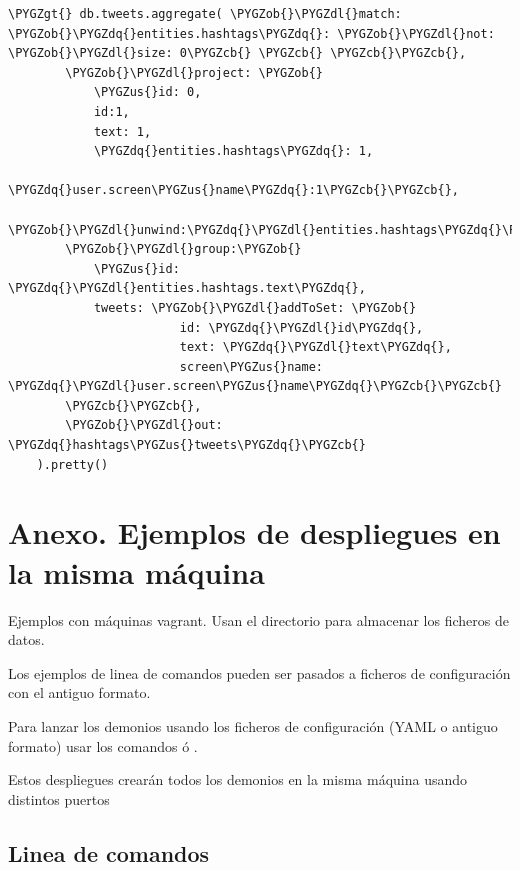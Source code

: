 \documentclass[a4paper,10pt,english]{sphinxmanual}
\def\PYGZus{\char`\_}
\def\PYGZob{\char`\{}
\def\PYGZcb{\char`\}}
\def\PYGZgt{\char`\>}
\def\PYGZdl{\char`\$}
\def\PYGZdq{\char`\"}
\begin{document}
\begin{itemize}
\begin{Verbatim}[commandchars=\\\{\}]
\PYGZgt{} db.tweets.aggregate( \PYGZob{}\PYGZdl{}match: \PYGZob{}\PYGZdq{}entities.hashtags\PYGZdq{}: \PYGZob{}\PYGZdl{}not: \PYGZob{}\PYGZdl{}size: 0\PYGZcb{} \PYGZcb{} \PYGZcb{}\PYGZcb{},
        \PYGZob{}\PYGZdl{}project: \PYGZob{}
            \PYGZus{}id: 0,
            id:1,
            text: 1,
            \PYGZdq{}entities.hashtags\PYGZdq{}: 1,
            \PYGZdq{}user.screen\PYGZus{}name\PYGZdq{}:1\PYGZcb{}\PYGZcb{},
        \PYGZob{}\PYGZdl{}unwind:\PYGZdq{}\PYGZdl{}entities.hashtags\PYGZdq{}\PYGZcb{},
        \PYGZob{}\PYGZdl{}group:\PYGZob{}
            \PYGZus{}id: \PYGZdq{}\PYGZdl{}entities.hashtags.text\PYGZdq{},
            tweets: \PYGZob{}\PYGZdl{}addToSet: \PYGZob{}
                        id: \PYGZdq{}\PYGZdl{}id\PYGZdq{},
                        text: \PYGZdq{}\PYGZdl{}text\PYGZdq{},
                        screen\PYGZus{}name: \PYGZdq{}\PYGZdl{}user.screen\PYGZus{}name\PYGZdq{}\PYGZcb{}\PYGZcb{}
        \PYGZcb{}\PYGZcb{},
        \PYGZob{}\PYGZdl{}out: \PYGZdq{}hashtags\PYGZus{}tweets\PYGZdq{}\PYGZcb{}
    ).pretty()
\end{Verbatim}

\end{itemize}


\chapter{Anexo. Ejemplos de despliegues en la misma máquina}
\label{contents/ejemplosDesplieguesLocal:anexo-ejemplos-de-despliegues-en-la-misma-maquina}\label{contents/ejemplosDesplieguesLocal::doc}
Ejemplos con máquinas vagrant. Usan el directorio  para almacenar los ficheros de datos.

Los ejemplos de linea de comandos pueden ser pasados a ficheros de configuración con el antiguo formato.

Para lanzar los demonios usando los ficheros de configuración (YAML o antiguo formato) usar los comandos  ó .

Estos despliegues crearán todos los demonios en la misma máquina usando distintos puertos


\section{Linea de comandos}
\label{contents/ejemplosDesplieguesLocal:linea-de-comandos}
\end{document}
